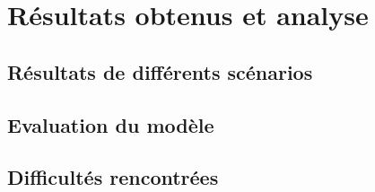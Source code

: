 
\section{Résultats obtenus et analyse}
 
\subsection{Résultats de différents scénarios}

\subsection{Evaluation du modèle}

\subsection{Difficultés rencontrées}